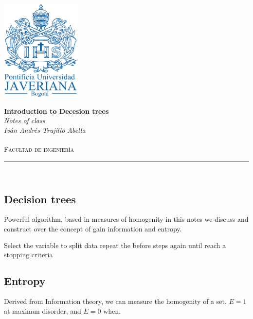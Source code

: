 \documentclass[10pt,a4paper]{article}
\author{Iván Andrés Trujillo }
\begin{document}
\newcommand{\HRule}{\rule{\linewidth}{0.5mm}}


\includegraphics[width = 4cm]{pujshield.eps}\\[0.5cm] 

\begin{center} 
\textbf{\LARGE Introduction to Decesion trees}\\[0.2cm]
\emph{\LARGE Notes of class}\\[0.3cm] 
\emph{Iván Andrés Trujillo Abella} \\
\textsc{\Large 
}\\[0.2cm] 
\textsc{\large Facultad de ingeniería}\\[0.5cm] 
\HRule \\[0.4cm]
\end{center}
\vspace{1cm}





\subsection{Decision trees}
Powerful algorithm, based in measures of homogenity in this notes we discuss and construct over the concept of gain information and entropy.





\begin{algorithm}[H]
\SetAlgoLined
{}
{Select the variable to split data \;
repeat the before steps again until reach a stopping criteria\;}


\end{algorithm}




\subsection{Entropy}
Derived from Information theory, we can measure the homogenity of a set, 
$E = 1$ at maximun disorder, and $E=0$ when.
\end{document}
